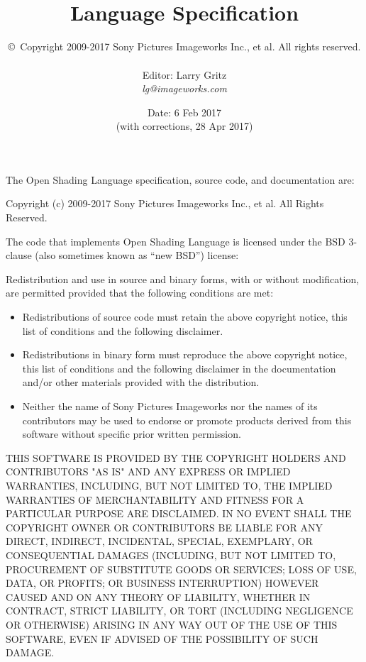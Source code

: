 \documentclass[11pt,letterpaper]{book}
\title{ 
{\Huge{\bf \product}
{\bf\sffamily \versionnumber} \medskip \\ \huge 
Language Specification
} \bigskip }
\author{
\copyright\ Copyright 2009-2017 Sony Pictures Imageworks Inc., et al. All rights reserved.
 \bigskip \\
\vspace{1in} \\
Editor: Larry Gritz \\
\emph{lg@imageworks.com}
}
\date{{\large Date: 6 Feb 2017 \\
 (with corrections, 28 Apr 2017)
}
\bigskip
\bigskip
\bigskip
 \bigskip 
}
\begin{document}
\frontmatter

\maketitle

\newpage
\label{speccopyr}

\vspace*{0.2in}

\noindent The Open Shading Language specification, source code, and
documentation are:

\vspace*{0.2in}

Copyright (c) 2009-2017 Sony Pictures Imageworks Inc., et al.
All Rights Reserved.

\vspace{0.5in}

The code that implements Open Shading Language is licensed under
the BSD 3-clause (also sometimes known as ``new BSD'') license:

\vspace{0.25in}

Redistribution and use in source and binary forms, with or without
modification, are permitted provided that the following conditions are
met:

\begin{itemize}
\item Redistributions of source code must retain the above copyright
  notice, this list of conditions and the following disclaimer.
\item Redistributions in binary form must reproduce the above copyright
  notice, this list of conditions and the following disclaimer in the
  documentation and/or other materials provided with the distribution.
\item Neither the name of Sony Pictures Imageworks nor the names of its
  contributors may be used to endorse or promote products derived from
  this software without specific prior written permission.
\end{itemize}

THIS SOFTWARE IS PROVIDED BY THE COPYRIGHT HOLDERS AND CONTRIBUTORS
"AS IS" AND ANY EXPRESS OR IMPLIED WARRANTIES, INCLUDING, BUT NOT
LIMITED TO, THE IMPLIED WARRANTIES OF MERCHANTABILITY AND FITNESS FOR
A PARTICULAR PURPOSE ARE DISCLAIMED. IN NO EVENT SHALL THE COPYRIGHT
OWNER OR CONTRIBUTORS BE LIABLE FOR ANY DIRECT, INDIRECT, INCIDENTAL,
SPECIAL, EXEMPLARY, OR CONSEQUENTIAL DAMAGES (INCLUDING, BUT NOT
LIMITED TO, PROCUREMENT OF SUBSTITUTE GOODS OR SERVICES; LOSS OF USE,
DATA, OR PROFITS; OR BUSINESS INTERRUPTION) HOWEVER CAUSED AND ON ANY
THEORY OF LIABILITY, WHETHER IN CONTRACT, STRICT LIABILITY, OR TORT
(INCLUDING NEGLIGENCE OR OTHERWISE) ARISING IN ANY WAY OUT OF THE USE
OF THIS SOFTWARE, EVEN IF ADVISED OF THE POSSIBILITY OF SUCH DAMAGE.
\end{document}
